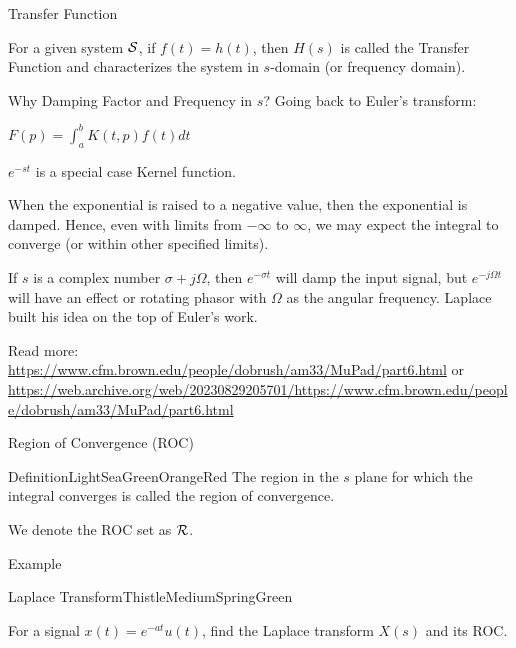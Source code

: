 \documentclass[aspectratio=169,xcolor=dvipsnames,svgnames,x11names,fleqn]{beamer}
\begin{document}
\begin{frame}{Transfer Function}
\begin{center}
    For a given system ${\mathcal S}$, if $f(t) = h(t)$, then $H(s)$ is called the Transfer Function and characterizes the system in $s$-domain (or frequency domain).
\end{center}
\end{frame}

\begin{frame}[allowframebreaks]{Why Damping Factor and Frequency in $s$?}
Going back to Euler's transform:
\begin{center}
     $F(p) = \int_a^b K(t, p)f(t) dt$
\end{center}

$e^{-st}$ is a special case Kernel function. 


\begin{gradyellow}
    When the exponential is raised to a negative value, then the exponential is damped.  Hence, even with limits from $-\infty$ to $\infty$, we may expect the integral to converge (or within other specified limits).
\end{gradyellow}

\newpage
If $s$ is a complex number $\sigma + j\Omega$, then $e^{-\sigma t}$ will damp the input signal, but $e^{-j\Omega t}$ will have an effect or rotating phasor with $\Omega$ as the angular frequency. Laplace built his idea on the top of Euler's work.

\vspace{15pt}

Read more: \url{https://www.cfm.brown.edu/people/dobrush/am33/MuPad/part6.html} or \url{https://web.archive.org/web/20230829205701/https://www.cfm.brown.edu/people/dobrush/am33/MuPad/part6.html}

\end{frame}


\begin{frame}{Region of Convergence (ROC)}

    \begin{custombox}{Definition}{LightSeaGreen}{OrangeRed}
    \large
        The region in the $s$ plane for which the integral converges is called the region of convergence.
    \end{custombox}

    We denote the ROC set as ${\mathcal R}$.
\end{frame}

\begin{frame}{Example}
\vspace*{-6\baselineskip}
\begin{custombox}{Laplace Transform}{Thistle}{MediumSpringGreen}

        \large
        
    For a signal $x(t) = e^{-at}u(t)$, find the Laplace transform $X(s)$ and its ROC.
    
\end{custombox}

\end{frame}
\end{document}
